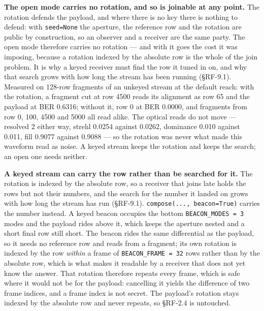 \documentclass[10pt,letterpaper,twocolumn]{article}
\begin{document}
\textbf{The open mode carries no rotation, and so is joinable at any point.} The rotation defends the payload, and where there is no key there is nothing to defend: with \texttt{seed=\allowbreak{}None} the aperture, the reference row and the rotation are public by construction, so an observer and a receiver are the same party. The open mode therefore carries no rotation --- and with it goes the cost it was imposing, because a rotation indexed by the absolute row is the whole of the join problem. It is why a keyed receiver must find the row it tuned in on, and why that search grows with how long the stream has been running (§RF-9.1). Measured on 128-row fragments of an unkeyed stream at the default reach: with the rotation, a fragment cut at row 4500 reads its alignment as row 65 and the payload at BER 0.6316; without it, row 0 at BER 0.0000, and fragments from row 0, 100, 4500 and 5000 all read alike. The optical reads do not move --- resolved 2 either way, strehl 0.0254 against 0.0262, dominance 0.010 against 0.011, fill 0.9077 against 0.9088 --- so the rotation was never what made this waveform read as noise. A keyed stream keeps the rotation and keeps the search; an open one needs neither.

\textbf{A keyed stream can carry the row rather than be searched for it.} The rotation is indexed by the absolute row, so a receiver that joins late holds the rows but not their numbers, and the search for the number it landed on grows with how long the stream has run (§RF-9.1). \texttt{compose(\allowbreak{}.\allowbreak{}.\allowbreak{}.\allowbreak{},\allowbreak{}\ beacon=\allowbreak{}True)\allowbreak{}} carries the number instead. A keyed beacon occupies the bottom \texttt{BEACON\_\allowbreak{}MODES\ =\allowbreak{}\ 3} modes and the payload rides above it, which keeps the aperture nested and a short final row still short. The beacon rides the same differential as the payload, so it needs no reference row and reads from a fragment; its own rotation is indexed by the row \emph{within} a frame of \texttt{BEACON\_\allowbreak{}FRAME\ =\allowbreak{}\ 32} rows rather than by the absolute row, which is what makes it readable by a receiver that does not yet know the answer. That rotation therefore repeats every frame, which is safe where it would not be for the payload: cancelling it yields the difference of two frame indices, and a frame index is not secret. The payload's rotation stays indexed by the absolute row and never repeats, so §RF-2.4 is untouched.
\end{document}
